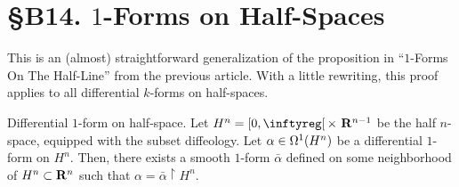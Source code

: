 
\chapter*{\S B14. $1$-Forms on Half-Spaces}
\setcounter{footnote}{0}


\begin{abstract}
  In this note we shall see that every differential $1$-form on the half-space $ H^n = [0,\infty[\, \times\, \RR^{n-1}$ is the restriction of a smooth $1$-form on $\RR^n$.
\end{abstract}


This is an (almost) straightforward generalization of the proposition in ``$1$-Forms On The Half-Line'' from the previous article.
With a little rewriting,
this proof applies to all differential $k$-forms on half-spaces.

\begin{Article}{Differential $1$-form on half-space.}{}
  Let $ H^n = [0,\infty[\, \times\ \RR^{n-1}$ be the half $n$-space,
  equipped with the subset diffeology.
  Let $\alpha \in \Omega^1( H^n)$ be a differential $1$-form on $ H^n$.
  Then,
  there exists a smooth $1$-form $\bar\alpha$ defined on some neighborhood of $ H^n \subset \mathbf{R}^n$ such that $\alpha = \bar\alpha \restriction H^n$.
\end{Article}

